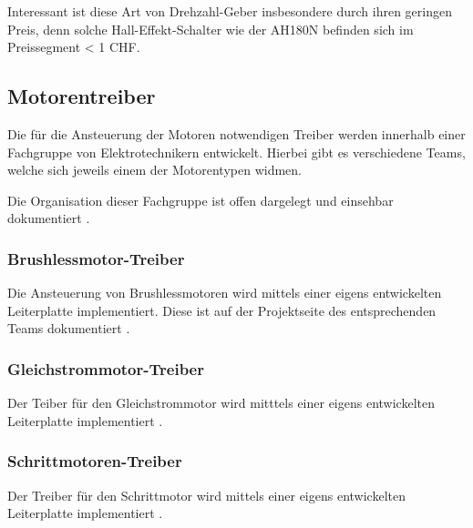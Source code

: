 Interessant ist diese Art von Drehzahl-Geber insbesondere durch ihren
geringen Preis, denn solche Hall-Effekt-Schalter wie der AH180N befinden
sich im Preissegment < 1 CHF.

\subsection{Motorentreiber}
Die für die Ansteuerung der Motoren notwendigen Treiber werden innerhalb
einer Fachgruppe von Elektrotechnikern entwickelt. Hierbei gibt es
verschiedene Teams, welche sich jeweils einem der Motorentypen widmen.

Die Organisation dieser Fachgruppe ist offen dargelegt und einsehbar
dokumentiert \cite{pren-et}.

\subsubsection{Brushlessmotor-Treiber}
Die Ansteuerung von Brushlessmotoren wird mittels einer eigens entwickelten
Leiterplatte implementiert. Diese ist auf der Projektseite des entsprechenden
Teams dokumentiert \cite{pren-et-bldc}.

\subsubsection{Gleichstrommotor-Treiber}
Der Teiber für den Gleichstrommotor wird mitttels einer eigens entwickelten
Leiterplatte implementiert \cite{pren-et-dc}.

\subsubsection{Schrittmotoren-Treiber}
Der Treiber für den Schrittmotor wird mittels einer eigens entwickelten
Leiterplatte implementiert \cite{pren-et-stepper}.
